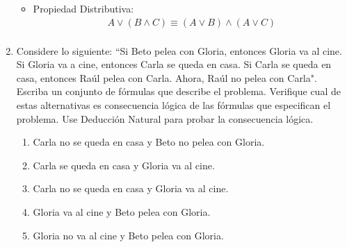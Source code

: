 \documentclass{article}
\begin{document}
\begin{enumerate}
    		 \begin{itemize}
    		     \item Propiedad Distributiva: 
    		     \begin{equation}
    		     \begin{aligned}
    		     A \vee (B \wedge C) \equiv (A \vee B) \wedge (A \vee C)\\
    		     \end{aligned}
    		     \end{equation}
    		 \end{itemize}
    		 
    		 \begin{prooftree}
    		    
    		 \end{prooftree}
		    
		 
		 \item Considere lo siguiente: ``Si Beto pelea con Gloria, entonces Gloria va al cine. Si Gloria va a cine, entonces Carla se queda en casa. Si Carla se queda en casa, entonces Raúl pelea con Carla. Ahora, Raúl no pelea con Carla". Escriba un conjunto de fórmulas que describe el problema. Verifique cual de estas alternativas es consecuencia lógica de las fórmulas que especifican el problema. Use Deducción Natural para probar la consecuencia lógica.
		 \begin{enumerate}
		     \item Carla no se queda en casa y Beto no pelea con Gloria.
		     \item Carla se queda en casa y Gloria va al cine.
		     \item Carla no se queda en casa y Gloria va al cine.
		     \item Gloria va al cine y Beto pelea con Gloria.
		     \item Gloria no va al cine y Beto pelea con Gloria.
		 \end{enumerate}
		 

\end{enumerate}
\end{document}
